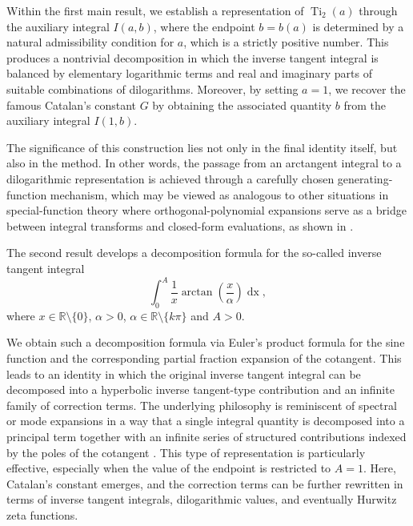 \documentclass[preprint,12pt,nopreprintline]{elsarticle}
\begin{document}
Within the first main result, we establish a representation of 
$\operatorname{Ti}_2\left(a\right)$ through the auxiliary integral $I\left(a,b\right)$, where the endpoint $b=b\left(a\right)$ is determined by a natural admissibility condition for $a$, which is a strictly positive number. This produces a nontrivial decomposition in which the inverse tangent integral is balanced by elementary logarithmic terms and real and imaginary parts of suitable combinations of dilogarithms. Moreover, by setting $a=1$, we recover the famous Catalan’s constant $G$ by obtaining the associated quantity $b$ from the auxiliary integral $I\left(1,b\right)$.

The significance of this construction lies not only in the final identity itself, but also in the method. In other words, the passage from an arctangent integral to a dilogarithmic representation is achieved through a carefully chosen generating-function mechanism, which may be viewed as analogous to other situations in special-function theory where orthogonal-polynomial expansions serve as a bridge between integral transforms and closed-form evaluations, as shown in \cite{ismail2002q,szego1975colloquium}. 

The second result develops a decomposition formula for the so-called inverse tangent integral
\begin{equation}
\int_0^A\frac{1}{x}\operatorname{arctan}\left(\frac{x}{\alpha}\right)\operatorname{dx},
\end{equation}
where  $x\in\mathbb{R}\setminus\{0\}$, $\alpha>0$, $\alpha\in\mathbb{R}\setminus\{k\pi\}$ and $A>0$. 

\newpage
We obtain such a decomposition formula via Euler’s product formula for the sine function and the corresponding partial fraction expansion of the cotangent. This leads to an identity in which the original inverse tangent integral can be decomposed into a hyperbolic inverse tangent-type contribution and an infinite family of correction terms. The underlying philosophy is reminiscent of spectral or mode expansions in a way that a single integral quantity is decomposed into a principal term together with an infinite series of structured contributions indexed by the poles of the cotangent \cite{cvijovic2009summation}. This type of representation is particularly effective, especially when the value of the endpoint is restricted to $A=1$. Here, Catalan’s constant emerges, and the correction terms can be further rewritten in terms of inverse tangent integrals, dilogarithmic values, and eventually Hurwitz zeta functions.
\end{document}
